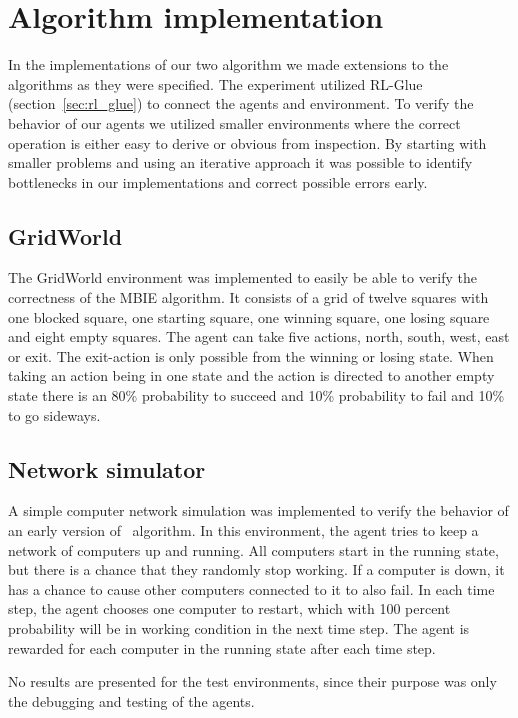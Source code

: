 \section{Algorithm implementation}
\label{sec:implementation}

In the implementations of our two algorithm we made extensions to the
algorithms as they were specified.  The experiment utilized RL-Glue
(section~\ref{sec:rl_glue}) to connect the agents and environment.  To verify
the behavior of our agents we utilized smaller environments where the correct
operation is either easy to derive or obvious from inspection. By starting with
smaller problems and using an iterative approach it was possible to identify
bottlenecks in our implementations and correct possible errors early.





\subsection{GridWorld}
\label{sec:intro_grid_world}

The GridWorld environment was implemented to easily be able to verify the
correctness of the MBIE algorithm. It consists of a grid of twelve squares with
one blocked square, one starting square, one winning square, one losing square and
eight empty squares. The agent can take five actions, north, south, west,
east or exit. The exit-action is only possible from the winning or losing
state. When taking an action being in one state and the action is directed to
another empty state there is an 80\% probability to succeed and 10\%
probability to fail and 10\% to go sideways.

\subsection{Network simulator}

A simple computer network simulation was implemented to verify the behavior of an
early version of \etre\ algorithm. In this environment, the agent tries to keep
a network of computers up and running. All computers start in the running
state, but there is a chance that they randomly stop working. If a computer is
down, it has a chance to cause other computers connected to it to also fail. In
each time step, the agent chooses one computer to restart, which with 100
percent probability will be in working condition in the next time step. The
agent is rewarded for each computer in the running state after each time step. 

No results are presented for the test environments, since their purpose was only the 
debugging and testing of the agents. 
